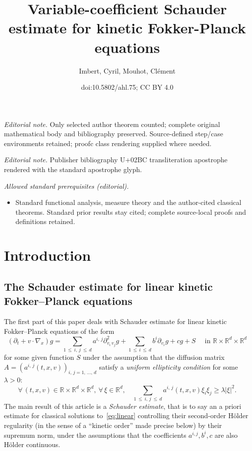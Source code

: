 \documentclass[10pt]{amsart}
\title{Variable-coefficient Schauder estimate for kinetic Fokker-Planck equations}
\author{Imbert, Cyril, Mouhot, Clément}
\date{doi:10.5802/ahl.75; CC BY 4.0}
\theoremstyle{definition}\newtheorem{defi}[theo]{Definition}\newtheorem{rema}[theo]{Remark}\newtheorem{exam}[theo]{Example}\newtheorem{exem}[theo]{Example}\newtheorem{nota}[theo]{Notation}
\newcommand{\R}{\mathbb{R}}
\let\oldforall\forall
\renewcommand*{\forall}{\mathrel{\oldforall}}
\begin{document}
\maketitle
\noindent\textit{Editorial note.} Only selected author theorem counted; complete original mathematical body and bibliography preserved. Source-defined step/case environments retained; proofc class rendering supplied where needed.\par\medskip
\noindent\textit{Editorial note.} Publisher bibliography U+02BC transliteration apostrophe rendered with the standard apostrophe glyph.\par\medskip
\noindent\textit{Allowed standard prerequisites (editorial).}\begin{itemize}
\item Standard functional analysis, measure theory and the author-cited classical theorems. Standard prior results stay cited; complete source-local proofs and definitions retained.
\end{itemize}\medskip

\section{Introduction}

\subsection{The Schauder estimate for linear kinetic Fokker--Planck equations}

The first part of this paper deals with Schauder estimate for linear kinetic Fokker--Planck equations of the form
\begin{equation}\label{eq:linear}
\left(\partial_t + v \cdot \nabla_x\right) g =
\sum_{1\,\le\:i,\,j\:\le\,d} a^{i,\,j} \partial^2_{v_i\,v_j} g + \sum_{1\,\le\,i\,\le\,d}b^i \partial_{v_i} g + c g + S \quad \text{ in } \R \times \R^d \times \R^d
\end{equation}
for some given function $S$ under the assumption that the diffusion matrix\linebreak$A= (a^{i,\,j}(t,x,v))_{i,\,j=1,\,\dots,\,d}$ satisfy a \emph{uniform ellipticity condition} for some $\lambda>0$:
\begin{equation}\label{eq:elliptic}
\forall \, (t,x,v) \in \R \times \R^d \times \R^d, \
\forall \, \xi \in \R^d, \quad
\sum_{1\,\le\:i,\,j\:\le\,d} a^{i,\,j}(t,x,v) \xi_i \xi_j \ge \lambda |\xi|^2.
\end{equation}
The main result of this article is a \emph{Schauder estimate}, that is to say an a priori estimate for classical solutions to~\eqref{eq:linear} controlling their second-order H\"older regularity (in the sense of a ``kinetic order'' made precise below) by their supremum norm, under the assumptions that the coefficients $a^{i,j},b^i,c$ are also H\"older continuous.
\end{document}
